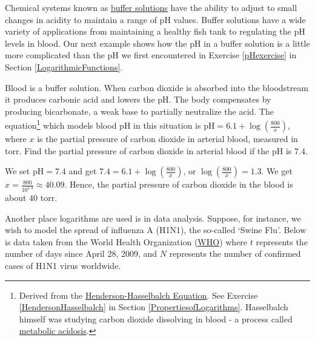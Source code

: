 \documentclass{ximera}
\begin{document}
 

Chemical systems known as \href{http://en.wikipedia.org/wiki/Buffer_solutions}{\underline{buffer solutions}}  have the ability to adjust to small changes in acidity to maintain a range of pH values.  Buffer solutions have a wide variety of applications from maintaining a healthy fish tank to regulating the pH levels in blood.  Our next example shows how the pH in a buffer solution is a little more complicated than the pH we first encountered in Exercise \ref{pHexercise} in Section \ref{LogarithmicFunctions}. 

 

\begin{example}  Blood is a buffer solution. When carbon dioxide is absorbed into the bloodstream it produces carbonic acid and lowers the pH.  The body compensates by producing bicarbonate, a weak base to partially neutralize the acid.   The equation\footnote{Derived from the \href{http://en.wikipedia.org/wiki/Henderson-Hasselbalch_equation}{\underline{Henderson-Hasselbalch Equation}}. See Exercise \ref{HendersonHasselbalch} in Section \ref{PropertiesofLogarithms}.  Hasselbalch himself was studying carbon dioxide dissolving in blood - a process called \href{http://en.wikipedia.org/wiki/Metabolic_acidosis}{\underline{metabolic acidosis}}.}   which models blood pH in this situation is $\text{pH} = 6.1 + \log\left(\frac{800}{x} \right)$, where $x$ is the partial pressure of carbon dioxide in arterial blood, measured in torr. Find the partial pressure of carbon dioxide in arterial blood if the pH is $7.4$.


 \begin{explanation} We set $\text{pH} = 7.4$ and get $ 7.4 = 6.1 + \log\left(\frac{800}{x} \right)$, or $\log\left(\frac{800}{x} \right) = 1.3$.   We get $x = \frac{800}{10^{1.3}} \approx 40.09$.  Hence, the partial pressure of carbon dioxide in the blood is about $40$ torr. 
\end{explanation}

\end{example}

Another place logarithms are used is in data analysis. Suppose, for instance, we wish to model the spread of influenza A (H1N1), the so-called `Swine Flu'.  Below is data taken from the World Health Organization (\href{http://www.who.int/csr/disease/swineflu/updates/en/index.html}{\underline{WHO}}) where $t$ represents the number of days since April 28, 2009, and $N$ represents the number of confirmed cases of H1N1 virus worldwide.
\end{document}
